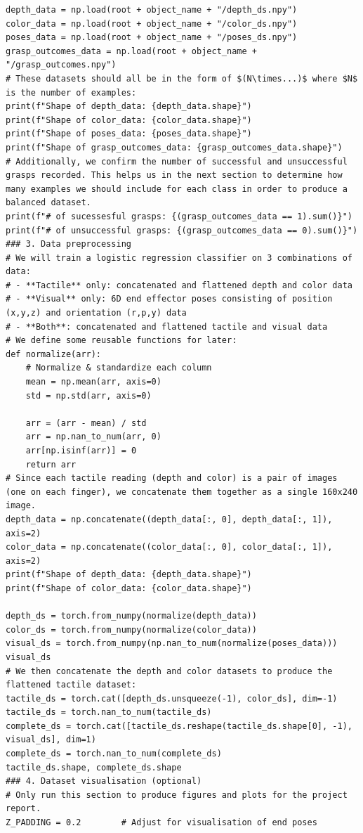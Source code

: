 \documentclass[11pt, a4paper]{report}
\begin{document}
\begin{lstlisting}
depth_data = np.load(root + object_name + "/depth_ds.npy")
color_data = np.load(root + object_name + "/color_ds.npy")
poses_data = np.load(root + object_name + "/poses_ds.npy")
grasp_outcomes_data = np.load(root + object_name + "/grasp_outcomes.npy")
# These datasets should all be in the form of $(N\times...)$ where $N$ is the number of examples:
print(f"Shape of depth_data: {depth_data.shape}")
print(f"Shape of color_data: {color_data.shape}")
print(f"Shape of poses_data: {poses_data.shape}")
print(f"Shape of grasp_outcomes_data: {grasp_outcomes_data.shape}")
# Additionally, we confirm the number of successful and unsuccessful grasps recorded. This helps us in the next section to determine how many examples we should include for each class in order to produce a balanced dataset.
print(f"# of sucessesful grasps: {(grasp_outcomes_data == 1).sum()}")
print(f"# of unsuccessful grasps: {(grasp_outcomes_data == 0).sum()}")
### 3. Data preprocessing
# We will train a logistic regression classifier on 3 combinations of data:
# - **Tactile** only: concatenated and flattened depth and color data
# - **Visual** only: 6D end effector poses consisting of position (x,y,z) and orientation (r,p,y) data
# - **Both**: concatenated and flattened tactile and visual data
# We define some reusable functions for later:
def normalize(arr):
    # Normalize & standardize each column
    mean = np.mean(arr, axis=0)
    std = np.std(arr, axis=0)
    
    arr = (arr - mean) / std
    arr = np.nan_to_num(arr, 0)
    arr[np.isinf(arr)] = 0
    return arr
# Since each tactile reading (depth and color) is a pair of images (one on each finger), we concatenate them together as a single 160x240 image.
depth_data = np.concatenate((depth_data[:, 0], depth_data[:, 1]), axis=2)
color_data = np.concatenate((color_data[:, 0], color_data[:, 1]), axis=2)
print(f"Shape of depth_data: {depth_data.shape}")
print(f"Shape of color_data: {color_data.shape}")

depth_ds = torch.from_numpy(normalize(depth_data))
color_ds = torch.from_numpy(normalize(color_data))
visual_ds = torch.from_numpy(np.nan_to_num(normalize(poses_data)))
visual_ds
# We then concatenate the depth and color datasets to produce the flattened tactile dataset:
tactile_ds = torch.cat([depth_ds.unsqueeze(-1), color_ds], dim=-1)
tactile_ds = torch.nan_to_num(tactile_ds)
complete_ds = torch.cat([tactile_ds.reshape(tactile_ds.shape[0], -1), visual_ds], dim=1)
complete_ds = torch.nan_to_num(complete_ds)
tactile_ds.shape, complete_ds.shape
### 4. Dataset visualisation (optional)
# Only run this section to produce figures and plots for the project report.
Z_PADDING = 0.2        # Adjust for visualisation of end poses



\end{lstlisting}
\end{document}
